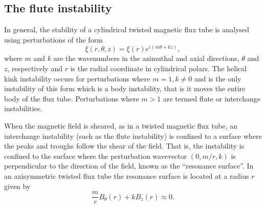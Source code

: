 \documentclass[fleqn,usenatbib]{mnras}
\newcommand{\rs}[2]{{#2}}
\begin{document}
\subsection{The flute instability}
\label{sec-flute-intro}

In general, the stability of a cylindrical twisted magnetic flux tube is analysed using perturbations of the form
\begin{equation}
  \label{eq:kink_perturbation}
\xi(r, \theta, z) = \xi(r) e^{i(m\theta + kz)},
\end{equation}
where $m$ and $k$ are the wavenumbers \rs{in the $\theta$ and $z$
  directions, respectively}{in the azimuthal and axial directions,
  $\theta$ and $z$, respectively and $r$ is the radial coordinate in
  cylindrical polars}. 
The helical kink instability occurs for perturbations where $m=1, k\ne0$ and is the only instability of this form which is a body instability, that is it moves the entire body of the flux tube. Perturbations where $m>1$ are termed flute or interchange instabilities.

When the magnetic field is sheared, as in a twisted magnetic flux
tube, an interchange instability (such as the flute
instability) is confined to a surface where the peaks and troughs
follow the shear of the field. That is, the instability is confined to
the surface where the perturbation wavevector $(0, m/r, k)$ is
perpendicular to the direction of the field, \rs{}{known as the
  ``resonance surface''}. \rs{which in}{In} an axisymmetric twisted
flux tube \rs{}{the resonance surface} is located at a radius $r$
given by
\begin{equation}
  \label{eq:resonant_surface}
\frac{m}{r} B_{\theta}(r) + kB_z(r) \approx 0.
\end{equation}
\end{document}

